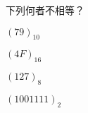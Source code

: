 \ifx\ntpcNinetyTwo\undefined[92學年基北區] \fi
下列何者不相等？
  \begin{optionlist}
  \item ${(79)}_{10}$
  \item ${(4F)}_{16}$
  \item ${(127)}_{8}$\label{ntpc-92-a7}
  \item ${(1001111)}_{2}$
  \end{optionlist}